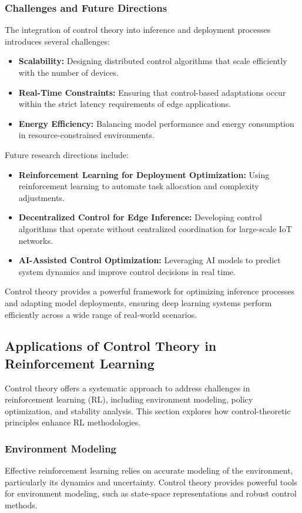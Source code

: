 \documentclass{IEEEojcsys}
\begin{document}
\subsubsection{Challenges and Future Directions}
The integration of control theory into inference and deployment processes introduces several challenges:
\begin{itemize}
    \item \textbf{Scalability:} Designing distributed control algorithms that scale efficiently with the number of devices.
    \item \textbf{Real-Time Constraints:} Ensuring that control-based adaptations occur within the strict latency requirements of edge applications.
    \item \textbf{Energy Efficiency:} Balancing model performance and energy consumption in resource-constrained environments.
\end{itemize}

Future research directions include:
\begin{itemize}
    \item \textbf{Reinforcement Learning for Deployment Optimization:} Using reinforcement learning to automate task allocation and complexity adjustments.
    \item \textbf{Decentralized Control for Edge Inference:} Developing control algorithms that operate without centralized coordination for large-scale IoT networks.
    \item \textbf{AI-Assisted Control Optimization:} Leveraging AI models to predict system dynamics and improve control decisions in real time.
\end{itemize}

Control theory provides a powerful framework for optimizing inference processes and adapting model deployments, ensuring deep learning systems perform efficiently across a wide range of real-world scenarios.

\subsection{Applications of Control Theory in Reinforcement Learning}
Control theory offers a systematic approach to address challenges in reinforcement learning (RL), including environment modeling, policy optimization, and stability analysis. This section explores how control-theoretic principles enhance RL methodologies.

\subsubsection{Environment Modeling}
Effective reinforcement learning relies on accurate modeling of the environment, particularly its dynamics and uncertainty. Control theory provides powerful tools for environment modeling, such as state-space representations and robust control methods.
\end{document}
